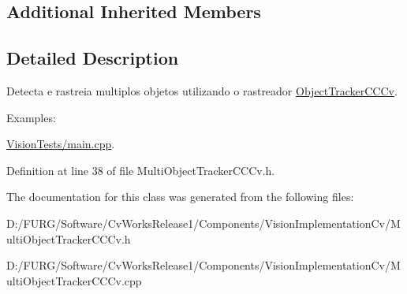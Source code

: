 \subsection*{Additional Inherited Members}


\subsection{Detailed Description}
Detecta e rastreia multiplos objetos utilizando o rastreador \textquotesingle{}\hyperlink{class_viscv_1_1_object_tracker_c_c_cv}{Object\+Tracker\+C\+C\+Cv}\textquotesingle{}. \begin{Desc}
\item[Examples\+: ]\par
\hyperlink{_vision_tests_2main_8cpp-example}{Vision\+Tests/main.\+cpp}.\end{Desc}


Definition at line 38 of file Multi\+Object\+Tracker\+C\+C\+Cv.\+h.



The documentation for this class was generated from the following files\+:\begin{DoxyCompactItemize}
\item 
D\+:/\+F\+U\+R\+G/\+Software/\+Cv\+Works\+Release1/\+Components/\+Vision\+Implementation\+Cv/Multi\+Object\+Tracker\+C\+C\+Cv.\+h\item 
D\+:/\+F\+U\+R\+G/\+Software/\+Cv\+Works\+Release1/\+Components/\+Vision\+Implementation\+Cv/Multi\+Object\+Tracker\+C\+C\+Cv.\+cpp\end{DoxyCompactItemize}
